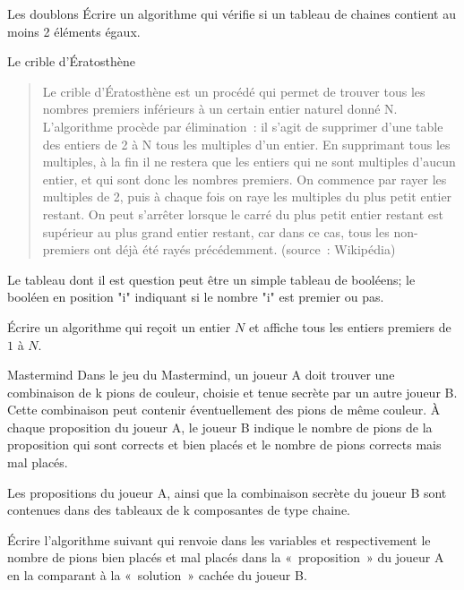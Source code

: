 	\begin{Exercice}{Les doublons}
		Écrire un algorithme qui vérifie 
		si un tableau de chaines
		contient au moins 2 éléments égaux.
	\end{Exercice}	
	\bigskip
	
	\begin{Exercice}{Le crible d’Ératosthène}
		\begin{quote}
			\og{} Le crible d’Ératosthène est un procédé 
			qui permet de trouver tous les nombres premiers inférieurs 
			à un certain entier naturel donné N.
			L’algorithme procède par élimination~: 
			il s’agit de supprimer d’une table des entiers de 2 à N 
			tous les multiples d’un entier. 
			En supprimant tous les multiples, 
			à la fin il ne restera que les entiers qui ne sont multiples d’aucun entier, 
			et qui sont donc les nombres premiers.
			On commence par rayer les multiples de 2, 
			puis à chaque fois on raye les multiples du plus petit entier restant.
			On peut s’arrêter lorsque le carré du plus petit entier restant 
			est supérieur au plus grand entier restant, car dans ce cas, 
			tous les non-premiers ont déjà été rayés précédemment.\fg{}
			(source~: Wikipédia)
		\end{quote}
		Le tableau dont il est question peut être un simple tableau
		de booléens; le booléen en position "i" indiquant 
		si le nombre "i" est premier ou pas.

		Écrire un algorithme qui reçoit un entier $N$
		et affiche tous les entiers premiers de $1$ à $N$.
	\end{Exercice}
	
	\begin{Exercice}{Mastermind}
		Dans le jeu du Mastermind, 
		un joueur A doit trouver une combinaison de k pions de couleur, 
		choisie et tenue secrète par un autre joueur B. 
		Cette combinaison peut contenir éventuellement des pions de même couleur. 
		À chaque proposition du joueur A, 
		le joueur B indique le nombre de pions de la proposition 
		qui sont corrects et bien placés 
		et le nombre de pions corrects mais mal placés. 
		
		Les propositions du joueur A, 
		ainsi que la combinaison secrète du joueur B
		sont contenues dans des tableaux de k composantes de type chaine.
		
		Écrire l’algorithme suivant qui renvoie dans les variables
		 et 
		respectivement le nombre de pions bien placés et mal placés 
		dans la «~proposition~» du joueur A en la comparant 
		à la «~solution~» cachée du joueur B.
	
		\begin{LDA}
		\end{LDA}
	\end{Exercice}
	
